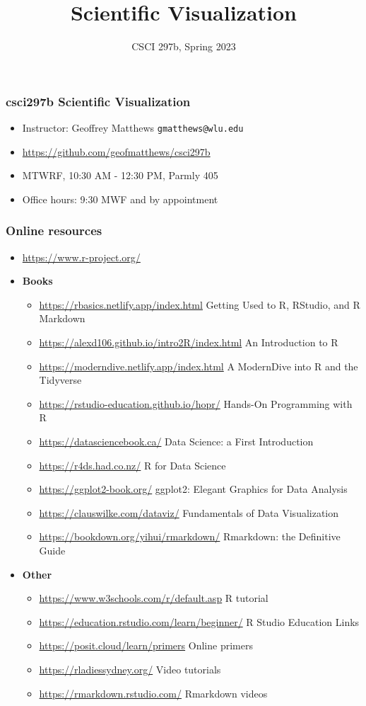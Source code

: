 \documentclass{beamer}
\title{Scientific Visualization}
\author{CSCI 297b, Spring 2023}
\newcommand{\bi}{\begin{itemize}}
\newcommand{\li}{\item}
\newcommand{\ei}{\end{itemize}}
\newcommand{\bfr}[1]{\begin{frame}[fragile]\frametitle{{ #1 }}}
\begin{document}
\begin{frame}
\maketitle
\end{frame}

\bfr{csci297b Scientific Visualization}
\bi
\li Instructor:  Geoffrey Matthews \verb|gmatthews@wlu.edu|
\li \url{https://github.com/geofmatthews/csci297b}
\li
MTWRF,
10:30 AM - 12:30 PM,
Parmly 405

\li Office hours:  9:30 MWF and by appointment
\ei
\end{frame}

\bfr{Online resources}

\bi\scriptsize
\li \url{https://www.r-project.org/}
\li
{\bf Books}
\bi\tiny
\li
\url{https://rbasics.netlify.app/index.html}
\dotfill
Getting Used to R, RStudio, and R Markdown

\li
\url{https://alexd106.github.io/intro2R/index.html}
\dotfill
An Introduction to R

\li
\url{https://moderndive.netlify.app/index.html}
\dotfill
A ModernDive into R and the Tidyverse

\li
\url{https://rstudio-education.github.io/hopr/}
\dotfill
Hands-On Programming with R

\li
\url{https://datasciencebook.ca/}
\dotfill
Data Science: a First Introduction

\li
\url{https://r4ds.had.co.nz/}
\dotfill
R for Data Science

\li
\url{https://ggplot2-book.org/}
\dotfill
ggplot2: Elegant Graphics for Data Analysis

\li
\url{https://clauswilke.com/dataviz/}
\dotfill
Fundamentals of Data Visualization


\li
\url{https://bookdown.org/yihui/rmarkdown/}
\dotfill
Rmarkdown: the Definitive Guide

\ei

\li
 {\bf Other}

\bi\tiny
\li
\url{https://www.w3schools.com/r/default.asp}
\dotfill
R tutorial

\li
\url{https://education.rstudio.com/learn/beginner/}
\dotfill
R Studio Education Links
\li
\url{https://posit.cloud/learn/primers}
\dotfill
Online primers

\li
\url{https://rladiessydney.org/}
\dotfill
Video tutorials

\li
\url{https://rmarkdown.rstudio.com/}
\dotfill
Rmarkdown videos

\ei
\ei
\end{frame}
\end{document}
